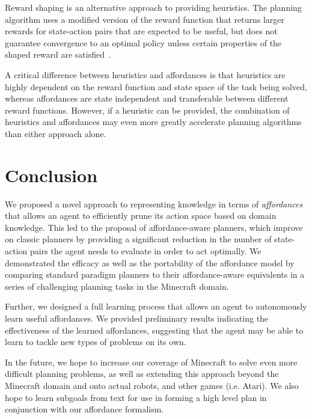 \documentclass[conference]{IEEEtran}
\begin{document}
Reward shaping is an alternative approach to providing heuristics. The planning algorithm uses a modified version of the reward function that returns larger rewards for state-action pairs that are expected to be useful, but does not guarantee convergence to an optimal policy unless certain properties of the shaped reward are satisfied~\citep{potshap}.

A critical difference between heuristics and affordances is that heuristics are highly dependent on the reward function and state space of the task being solved, whereas affordances are state independent and transferable between different reward functions. However, if a heuristic can be provided, the combination of heuristics and affordances may even more greatly accelerate planning algorithms than either approach alone.

\section{Conclusion}
\label{sec:conclusion}

We proposed a novel approach to representing knowledge in terms of
{\em affordances}~\citep{gibson77} that allows an agent to efficiently
prune its action space based on domain knowledge. This led to the 
proposal of affordance-aware planners, which improve on classic planners
by providing a significant reduction in the number of state-action pairs the
agent needs to evaluate in order to act optimally. We demonstrated the efficacy 
as well as the portability of the affordance model by comparing standard paradigm
planners to their affordance-aware equivalents in a series of challenging planning tasks in the Minecraft
domain.

Further, we designed a full learning process that allows an agent to autonomously learn useful affordances.
We provided preliminary results indicating the effectiveness of the learned affordances, suggesting that
the agent may be able to learn to tackle new types of problems on its own.

In the future, we hope to increase our coverage of Minecraft to solve even more difficult planning problems, as well as
extending this approach beyond the Minecraft domain and onto actual robots, and other games (i.e. Atari). We also hope
to learn subgoals from text for use in forming a high level plan in conjunction with our affordance formalism.

\end{document}
